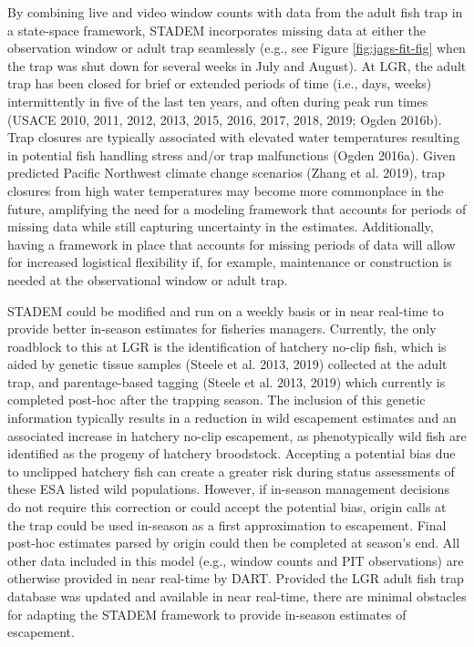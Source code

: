 \documentclass[
  12pt,
]{article}
\begin{document}
By combining live and video window counts with data from the adult fish trap in a state-space framework, STADEM incorporates missing data at either the observation window or adult trap seamlessly (e.g., see Figure \ref{fig:jags-fit-fig} when the trap was shut down for several weeks in July and August). At LGR, the adult trap has been closed for brief or extended periods of time (i.e., days, weeks) intermittently in five of the last ten years, and often during peak run times (USACE 2010, 2011, 2012, 2013, 2015, 2016, 2017, 2018, 2019; Ogden 2016b). Trap closures are typically associated with elevated water temperatures resulting in potential fish handling stress and/or trap malfunctions (Ogden 2016a). Given predicted Pacific Northwest climate change scenarios (Zhang et al. 2019), trap closures from high water temperatures may become more commonplace in the future, amplifying the need for a modeling framework that accounts for periods of missing data while still capturing uncertainty in the estimates. Additionally, having a framework in place that accounts for missing periods of data will allow for increased logistical flexibility if, for example, maintenance or construction is needed at the observational window or adult trap.

STADEM could be modified and run on a weekly basis or in near real-time to provide better in-season estimates for fisheries managers. Currently, the only roadblock to this at LGR is the identification of hatchery no-clip fish, which is aided by genetic tissue samples (Steele et al. 2013, 2019) collected at the adult trap, and parentage-based tagging (Steele et al. 2013, 2019) which currently is completed post-hoc after the trapping season. The inclusion of this genetic information typically results in a reduction in wild escapement estimates and an associated increase in hatchery no-clip escapement, as phenotypically wild fish are identified as the progeny of hatchery broodstock. Accepting a potential bias due to unclipped hatchery fish can create a greater risk during status assessments of these ESA listed wild populations. However, if in-season management decisions do not require this correction or could accept the potential bias, origin calls at the trap could be used in-season as a first approximation to escapement. Final post-hoc estimates parsed by origin could then be completed at season's end. All other data included in this model (e.g., window counts and PIT observations) are otherwise provided in near real-time by DART. Provided the LGR adult fish trap database was updated and available in near real-time, there are minimal obstacles for adapting the STADEM framework to provide in-season estimates of escapement.
\end{document}
